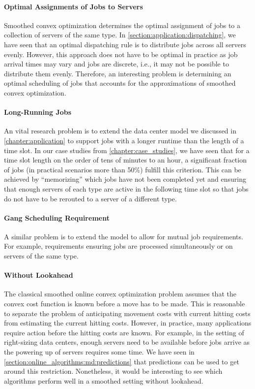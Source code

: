 \paragraph{Optimal Assignments of Jobs to Servers} Smoothed convex optimization determines the optimal assignment of jobs to a collection of servers of the same type. In \cref{section:application:dispatching}, we have seen that an optimal dispatching rule is to distribute jobs across all servers evenly. However, this approach does not have to be optimal in practice as job arrival times may vary and jobs are discrete, i.e., it may not be possible to distribute them evenly. Therefore, an interesting problem is determining an optimal scheduling of jobs that accounts for the approximations of smoothed convex optimization.

\paragraph{Long-Running Jobs} An vital research problem is to extend the data center model we discussed in \cref{chapter:application} to support jobs with a longer runtime than the length of a time slot. In our case studies from \cref{chapter:case_studies}, we have seen that for a time slot length on the order of tens of minutes to an hour, a significant fraction of jobs (in practical scenarios more than 50\%) fulfill this criterion. This can be achieved by ``memorizing'' which jobs have not been completed yet and ensuring that enough servers of each type are active in the following time slot so that jobs do not have to be rerouted to a server of a different type.

\paragraph{Gang Scheduling Requirement} A similar problem is to extend the model to allow for mutual job requirements. For example, requirements ensuring jobs are processed simultaneously or on servers of the same type.

\paragraph{Without Lookahead} The classical smoothed online convex optimization problem assumes that the convex cost function is known before a move has to be made. This is reasonable to separate the problem of anticipating movement costs with current hitting costs from estimating the current hitting costs. However, in practice, many applications require action before the hitting costs are known. For example, in the setting of right-sizing data centers, enough servers need to be available before jobs arrive as the powering up of servers requires some time. We have seen in \cref{section:online_algorithms:md:predictions} that predictions can be used to get around this restriction. Nonetheless, it would be interesting to see which algorithms perform well in a smoothed setting without lookahead.


